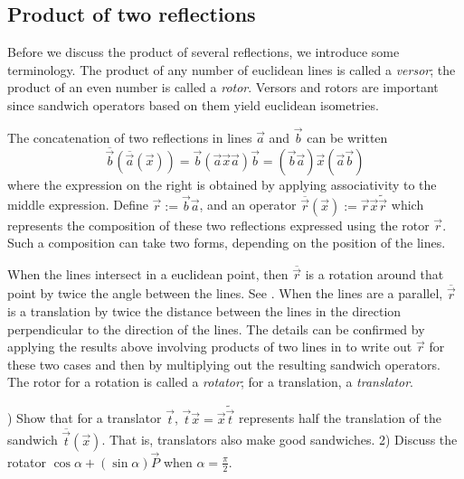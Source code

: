 \documentclass{birkjour}
\newcommand{\mydogblue}{{\color{gray} $\square$~~}}
\begin{document}
{\subsection{Product of two reflections}
\label{sec:prtworef}
Before we discuss the product of several  reflections,  we introduce some terminology. The product of any number of euclidean lines is called a \emph{versor};  the product of an even number is called a \emph{rotor}.  Versors and rotors are important since sandwich operators based on them yield euclidean isometries.

The concatenation of two reflections  in lines $\vec{a}$ and $\vec{b}$ can be written \[\overline{\vec{b}}(\overline{\vec{a}}(\vec{x})) = \vec{b}(\vec{a}\vec{x}\vec{a})\vec{b} = (\vec{b}\vec{a})\vec{x}(\vec{a}\vec{b})\]  where the expression on the right is obtained by applying associativity to the middle expression.  Define  $\vec{r} := \vec{b}\vec{a}$, and an operator $\overline{\vec{r}}(\vec{x}):= \vec{r} \vec{x}\widetilde{\vec{r}}$ which represents the composition of these two reflections expressed using the rotor  $\vec{r}$. Such a composition can take two forms, depending on the position of the lines.  

When the lines intersect in a euclidean point, then $\overline{\vec{r}}$  is a rotation around that point by twice the angle between the lines.  See .  When the lines are a parallel, $\overline{\vec{r}}$ is a translation by twice the distance between the lines in the direction perpendicular to the direction of the lines.  The details can be confirmed by applying the results above involving products of two lines  in  to write out $\vec{r}$ for these two cases and then by multiplying out the resulting sandwich operators.  The rotor for a rotation is called a \emph{rotator}; for a translation, a \emph{translator}. 


) Show that for a translator $\vec{t}$, $\vec{t}\vec{x} = \vec{x}\widetilde{\vec{t}}$ represents half the translation of the sandwich $\overline{\vec{t}}(\vec{x})$. That is, translators also make good  sandwiches. 2) Discuss the rotator $\cos{\alpha} + (\sin{\alpha})\vec{P}$ when $\alpha = \frac{\pi}{2}$. %

}
\end{document}
